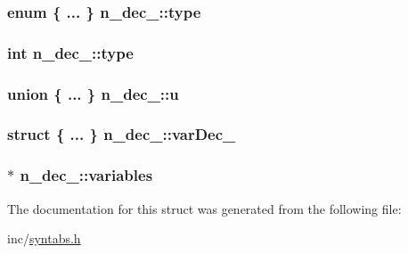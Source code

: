 \subsubsection[{\texorpdfstring{type}{type}}]{\setlength{\rightskip}{0pt plus 5cm}enum \{ ... \}   n\+\_\+dec\+\_\+\+::type}\hypertarget{structn__dec___ac23505a415708f3ba2bdac410063f7c0}{}\label{structn__dec___ac23505a415708f3ba2bdac410063f7c0}
\subsubsection[{\texorpdfstring{type}{type}}]{\setlength{\rightskip}{0pt plus 5cm}int n\+\_\+dec\+\_\+\+::type}\hypertarget{structn__dec___a4011cd805dd5d7e02f15c757d3945cfd}{}\label{structn__dec___a4011cd805dd5d7e02f15c757d3945cfd}
\subsubsection[{\texorpdfstring{u}{u}}]{\setlength{\rightskip}{0pt plus 5cm}union \{ ... \}   n\+\_\+dec\+\_\+\+::u}\hypertarget{structn__dec___af0174babc6aca640efdc1aa73a7f78bf}{}\label{structn__dec___af0174babc6aca640efdc1aa73a7f78bf}
\subsubsection[{\texorpdfstring{var\+Dec\+\_\+}{varDec_}}]{\setlength{\rightskip}{0pt plus 5cm}struct \{ ... \}  n\+\_\+dec\+\_\+\+::var\+Dec\+\_\+}\hypertarget{structn__dec___a08ab11dd0c1fd82d3251e02f465ff38f}{}\label{structn__dec___a08ab11dd0c1fd82d3251e02f465ff38f}
\subsubsection[{\texorpdfstring{variables}{variables}}]{$\ast$ n\+\_\+dec\+\_\+\+::variables}\hypertarget{structn__dec___a3f9c53db6f8f024820021a28974e6a9d}{}\label{structn__dec___a3f9c53db6f8f024820021a28974e6a9d}


The documentation for this struct was generated from the following file\+:\begin{DoxyCompactItemize}
\item 
inc/\hyperlink{syntabs_8h}{syntabs.\+h}\end{DoxyCompactItemize}
